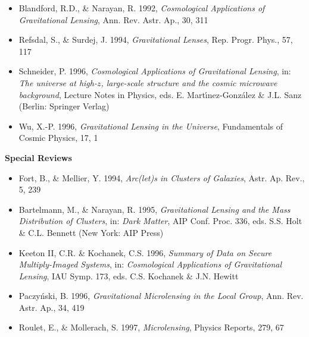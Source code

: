 \documentclass[a4paper,10pt]{article} %
\begin{document}
\begin{itemize}

\item[--] Blandford, R.D., \& Narayan, R. 1992, {\em Cosmological
Applications of Gravitational Lensing\/}, Ann. Rev. Astr. Ap., 30, 311

\item[--] Refsdal, S., \& Surdej, J. 1994, {\em Gravitational
Lenses\/}, Rep. Progr. Phys., 57, 117

\item[--] Schneider, P. 1996, {\em Cosmological Applications of
Gravitational Lensing\/}, in: {\em The universe at high-$z$,
large-scale structure and the cosmic microwave background}, Lecture
Notes in Physics, eds. E. Mart{\'\i}nez-Gonz\'alez \& J.L. Sanz
(Berlin: Springer Verlag)

\item[--] Wu, X.-P. 1996, {\em Gravitational Lensing in the
Universe\/}, Fundamentals of Cosmic Physics, 17, 1

\end{itemize}

\begin{center}
{\bf Special Reviews}
\end{center}

\begin{itemize}

\item[--] Fort, B., \& Mellier, Y. 1994, {\em Arc(let)s in Clusters of
Galaxies\/}, Astr. Ap. Rev., 5, 239

\item[--] Bartelmann, M., \& Narayan, R. 1995, {\em Gravitational
Lensing and the Mass Distribution of Clusters\/}, in: {\em Dark
Matter\/}, AIP Conf. Proc. 336, eds. S.S. Holt \& C.L. Bennett (New
York: AIP Press)

\item[--] Keeton II, C.R. \& Kochanek, C.S. 1996, {\em Summary of Data
on Secure Multiply-Imaged Systems\/}, in: {\em Cosmological
Applications of Gravitational Lensing\/}, IAU Symp. 173,
eds. C.S. Kochanek \& J.N. Hewitt

\item[--] Paczy\'nski, B. 1996, {\em Gravitational Microlensing in the
Local Group\/}, Ann. Rev. Astr. Ap., 34, 419

\item[--] Roulet, E., \& Mollerach, S. 1997, {\em Microlensing\/},
Physics Reports, 279, 67

\end{itemize}
\end{document}
